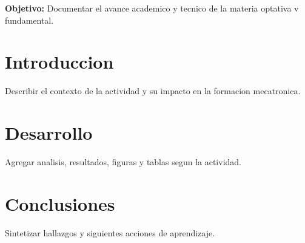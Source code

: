 \documentclass[spanish,letterpaper,oneside]{article}
\begin{document}
\templatePortrait
\templatePagecfg
\onehalfspacing

\begin{abstractd}
\textbf{Objetivo:} Documentar el avance academico y tecnico de la materia optativa v fundamental.
\end{abstractd}

\templateIndex
\templateFinalcfg

\section{Introduccion}
Describir el contexto de la actividad y su impacto en la formacion mecatronica.

\section{Desarrollo}
Agregar analisis, resultados, figuras y tablas segun la actividad.

\section{Conclusiones}
Sintetizar hallazgos y siguientes acciones de aprendizaje.



\end{document}
